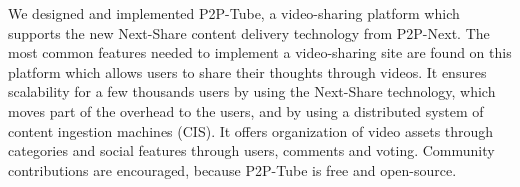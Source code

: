 We designed and implemented P2P-Tube, a video-sharing platform which supports the new Next-Share content delivery technology from P2P-Next. The most common features needed to implement a video-sharing site are found on this platform which allows users to share their thoughts through videos. It ensures scalability for a few thousands users by using the Next-Share technology, which moves part of the overhead to the users, and by using a distributed system of content ingestion machines (CIS). It offers organization of video assets through categories and social features through users, comments and voting. Community contributions are encouraged, because P2P-Tube is free and open-source.